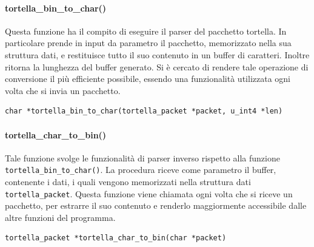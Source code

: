 \paragraph{tortella\_bin\_to\_char()}
Questa funzione ha il compito di eseguire il parser del pacchetto tortella. In particolare prende in input da parametro il pacchetto, memorizzato nella sua struttura dati, e restituisce tutto il suo contenuto in un buffer di caratteri. Inoltre ritorna la lunghezza del buffer generato. Si è cercato di rendere tale operazione di conversione il più efficiente possibile, essendo una funzionalità utilizzata ogni volta che si invia un pacchetto.
\begin{lstlisting}
char *tortella_bin_to_char(tortella_packet *packet, u_int4 *len)
\end{lstlisting}
\paragraph{tortella\_char\_to\_bin()}
Tale funzione svolge le funzionalità di parser inverso rispetto alla funzione \texttt{tortella\_bin\_to\_char()}. La procedura riceve come parametro il buffer, contenente i dati, i quali vengono memorizzati nella struttura dati \texttt{tortella\_packet}. Questa funzione viene chiamata ogni volta che si riceve un pacchetto, per estrarre il suo contenuto e renderlo maggiormente accessibile dalle altre funzioni del programma.
\begin{lstlisting}
tortella_packet *tortella_char_to_bin(char *packet)
\end{lstlisting}
